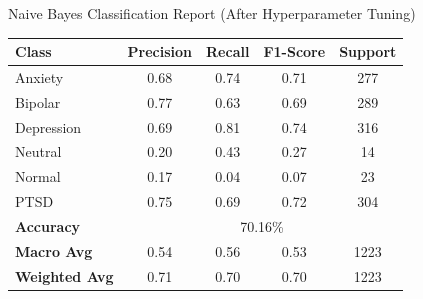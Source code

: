 \begin{center}
\vspace{0.25in}

Naive Bayes Classification Report (After Hyperparameter Tuning)
\begin{tabular}{|l|c|c|c|c|}
\hline
\textbf{Class} & \textbf{Precision} & \textbf{Recall} & \textbf{F1-Score} & \textbf{Support} \\ \hline
Anxiety        & 0.68               & 0.74            & 0.71              & 277              \\ \hline
Bipolar        & 0.77               & 0.63            & 0.69              & 289              \\ \hline
Depression     & 0.69               & 0.81            & 0.74              & 316              \\ \hline
Neutral        & 0.20               & 0.43            & 0.27              & 14               \\ \hline
Normal         & 0.17               & 0.04            & 0.07              & 23               \\ \hline
PTSD           & 0.75               & 0.69            & 0.72              & 304              \\ \hline
\textbf{Accuracy} & \multicolumn{4}{|c|}{70.16\%} \\ \hline
\textbf{Macro Avg} & 0.54            & 0.56            & 0.53              & 1223             \\ \hline
\textbf{Weighted Avg} & 0.71         & 0.70            & 0.70              & 1223             \\ \hline
\end{tabular}

\vspace{0.25in}


\end{center}
